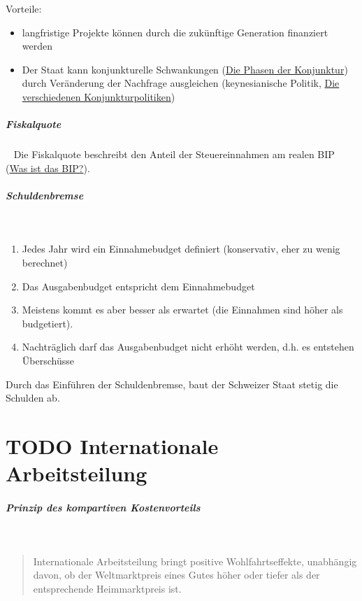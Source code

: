 \documentclass[11pt,twoside,landscape]{article}
\begin{document}
\begin{multicols}{3}
Vorteile:
\begin{itemize}
\item langfristige Projekte können durch die zukünftige Generation finanziert werden
\item Der Staat kann konjunkturelle Schwankungen (\href{../../../roam/20220614102344-die_phasen_der_konjunktur.org}{Die Phasen der Konjunktur}) durch Veränderung der Nachfrage ausgleichen (keynesianische Politik, \href{../../../roam/20220614161544-die_verschiedenen_konjunkturpolitiken.org}{Die verschiedenen Konjunkturpolitiken})
\end{itemize}

\subparagraph{Fiskalquote} \
\label{sec:orgd8421dc}
Die Fiskalquote beschreibt den Anteil der Steuereinnahmen am realen BIP (\href{../../../roam/20220504151208-was_ist_das_bip.org}{Was ist das BIP?}).

\subparagraph{Schuldenbremse} \
\label{sec:orgc89ead5}
\begin{enumerate}
\item Jedes Jahr wird ein Einnahmebudget definiert (konservativ, eher zu wenig berechnet)
\item Das Ausgabenbudget entspricht dem Einnahmebudget
\item Meistens kommt es aber besser als erwartet (die Einnahmen sind höher als budgetiert).
\item Nachträglich darf das Ausgabenbudget nicht erhöht werden, d.h. es entstehen Überschüsse
\end{enumerate}


Durch das Einführen der Schuldenbremse, baut der Schweizer Staat stetig die Schulden ab.

\section{{\bfseries\sffamily TODO} Internationale Arbeitsteilung}
\label{sec:orgad3c98e}
\subparagraph{Prinzip des kompartiven Kostenvorteils} \
\label{sec:org7b0df11}

\begin{quote}
Internationale Arbeitsteilung bringt positive Wohlfahrtseffekte, unabhängig
davon, ob der Weltmarktpreis eines Gutes höher oder tiefer als der
entsprechende Heimmarktpreis ist.
\end{quote}


\end{multicols}
\end{document}
